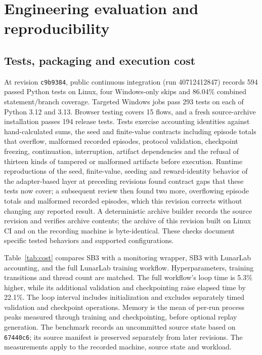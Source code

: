 \documentclass[preprint,12pt]{elsarticle}
\newcommand{\swrev}{c9b9384}
\newcommand{\cirun}{40712412847}
\begin{document}
\section{Engineering evaluation and reproducibility}
\subsection{Tests, packaging and execution cost}
At revision \texttt{\swrev}, public continuous integration (run \cirun) records 594 passed Python tests on Linux, four Windows-only skips and 86.04\% combined statement/branch coverage. Targeted Windows jobs pass 293 tests on each of Python 3.12 and 3.13. Browser testing covers 15 flows, and a fresh source-archive installation passes 194 release tests. Tests exercise accounting identities against hand-calculated sums, the seed and finite-value contracts including episode totals that overflow, malformed recorded episodes, protocol validation, checkpoint freezing, continuation, interruption, artifact dependencies and the refusal of thirteen kinds of tampered or malformed artifacts before execution. Runtime reproductions of the seed, finite-value, seeding and reward-identity behavior of the adapter-based layer at preceding revisions found contract gaps that these tests now cover; a subsequent review then found two more, overflowing episode totals and malformed recorded episodes, which this revision corrects without changing any reported result. A deterministic archive builder records the source revision and verifies archive contents; the archive of this revision built on Linux CI and on the recording machine is byte-identical. These checks document specific tested behaviors and supported configurations.

Table~\ref{tab:cost} compares SB3 with a monitoring wrapper, SB3 with LunarLab accounting, and the full LunarLab training workflow. Hyperparameters, training transitions and thread count are matched. The full workflow's loop time is 5.3\% higher, while its additional validation and checkpointing raise elapsed time by 22.1\%. The loop interval includes initialization and excludes separately timed validation and checkpoint operations. Memory is the mean of per-run process peaks measured through training and checkpointing, before optional replay generation. The benchmark records an uncommitted source state based on \texttt{67440c6}; its source manifest is preserved separately from later revisions. The measurements apply to the recorded machine, source state and workload.
\end{document}
